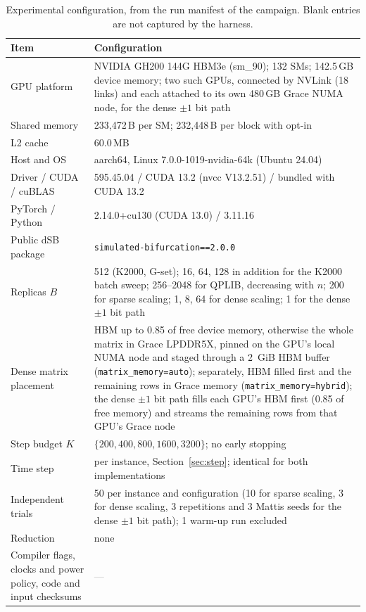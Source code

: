 \documentclass[11pt,a4paper]{article}
\newcommand{\blank}{\textcolor{gray}{---}}
\newcommand{\code}[1]{\texttt{#1}}
\begin{document}
\begin{table}[!ht]\centering\small
\caption{Experimental configuration, from the run manifest of the campaign. Blank entries are not captured by the harness.}
\label{tab:config}
\begin{tabularx}{\linewidth}{lX}\toprule
Item & Configuration \\
\midrule
GPU platform            & NVIDIA GH200 144G HBM3e (sm\_90); 132 SMs; 142.5\,GB device memory; two such GPUs, connected by NVLink (18 links) and each attached to its own 480\,GB Grace NUMA node, for the dense $\pm1$ bit path \\
Shared memory           & 233{,}472\,B per SM; 232{,}448\,B per block with opt-in \\
L2 cache                & 60.0\,MB \\
Host and OS             & aarch64, Linux 7.0.0-1019-nvidia-64k (Ubuntu 24.04) \\
Driver / CUDA / cuBLAS  & 595.45.04 / CUDA 13.2 (nvcc V13.2.51) / bundled with CUDA 13.2 \\
PyTorch / Python        & 2.14.0+cu130 (CUDA 13.0) / 3.11.16 \\
Public dSB package      & \code{simulated-bifurcation==2.0.0} \\
Replicas $B$            & 512 (K2000, G-set); 16, 64, 128 in addition for the K2000 batch sweep; 256--2048 for QPLIB, decreasing with $n$; 200 for sparse scaling; 1, 8, 64 for dense scaling; 1 for the dense $\pm1$ bit path \\
Dense matrix placement  & HBM up to 0.85 of free device memory, otherwise the whole matrix in Grace LPDDR5X, pinned on the GPU's local NUMA node and staged through a 2~GiB HBM buffer (\code{matrix\_memory=auto}); separately, HBM filled first and the remaining rows in Grace memory (\code{matrix\_memory=hybrid}); the dense $\pm1$ bit path fills each GPU's HBM first (0.85 of free memory) and streams the remaining rows from that GPU's Grace node \\
Step budget $K$         & $\{200,400,800,1600,3200\}$; no early stopping \\
Time step               & per instance, Section~\ref{sec:step}; identical for both implementations \\
Independent trials      & 50 per instance and configuration (10 for sparse scaling, 3 for dense scaling, 3 repetitions and 3 Mattis seeds for the dense $\pm1$ bit path); 1 warm-up run excluded \\
Reduction               & none \\
Compiler flags, clocks and power policy, code and input checksums & \blank \\
\bottomrule
\end{tabularx}
\end{table}
\end{document}
